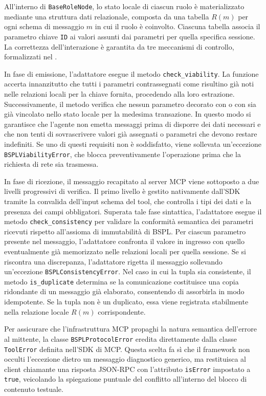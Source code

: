 All'interno di \lstinline|BaseRoleNode|, lo stato locale di ciascun ruolo è materializzato mediante una struttura dati relazionale, composta da una tabella $R(m)$ per ogni schema di messaggio $m$ in cui il ruolo è coinvolto. Ciascuna tabella associa il parametro chiave \texttt{ID} ai valori assunti dai parametri per quella specifica sessione. La correttezza dell'interazione è garantita da tre meccanismi di controllo, formalizzati nel .

In fase di emissione, l'adattatore esegue il metodo \lstinline|check_viability|. La funzione accerta innanzitutto che tutti i parametri contrassegnati come  risultino già noti nelle relazioni locali per la chiave fornita, procedendo alla loro estrazione. Successivamente, il metodo verifica che nessun parametro decorato con  o con  sia già vincolato nello stato locale per la medesima transazione. In questo modo si garantisce che l'agente non emetta messaggi prima di disporre dei dati necessari e che non tenti di sovrascrivere valori già assegnati o parametri che devono restare indefiniti. Se uno di questi requisiti non è soddisfatto, viene sollevata un'eccezione \lstinline|BSPLViabilityError|, che blocca preventivamente l'operazione prima che la richiesta di rete sia trasmessa.

In fase di ricezione, il messaggio recapitato al server MCP viene sottoposto a due livelli progressivi di verifica. Il primo livello è gestito nativamente dall'SDK tramite la convalida dell'input schema del tool, che controlla i tipi dei dati e la presenza dei campi obbligatori. Superata tale fase sintattica, l'adattatore esegue il metodo \lstinline|check_consistency| per validare la conformità semantica dei parametri ricevuti rispetto all'assioma di immutabilità di BSPL. Per ciascun parametro presente nel messaggio, l'adattatore confronta il valore in ingresso con quello eventualmente già memorizzato nelle relazioni locali per quella sessione. Se si riscontra una discrepanza, l'adattatore rigetta il messaggio sollevando un'eccezione \lstinline|BSPLConsistencyError|. Nel caso in cui la tupla sia consistente, il metodo \lstinline|is_duplicate| determina se la comunicazione costituisce una copia ridondante di un messaggio già elaborato, consentendo di assorbirla in modo idempotente. Se la tupla non è un duplicato, essa viene registrata stabilmente nella relazione locale $R(m)$ corrispondente.

Per assicurare che l'infrastruttura MCP propaghi la natura semantica dell'errore al mittente, la classe \lstinline|BSPLProtocolError| eredita direttamente dalla classe \lstinline|ToolError| definita nell'SDK di MCP. Questa scelta fa sì che il framework non occulti l'eccezione dietro un messaggio diagnostico generico, ma restituisca al client chiamante una risposta JSON-RPC con l'attributo \lstinline|isError| impostato a \lstinline|true|, veicolando la spiegazione puntuale del conflitto all'interno del blocco di contenuto testuale.

